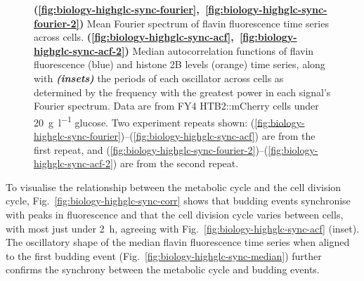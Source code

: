 \begin{figure}[b!]
  \caption[
    Mean Fourier spectrum of flavin fluorescence time series across cells.
    Median autocorrelation functions of flavin fluorescence and histone 2B levels time series, along with the periods of each oscillator across cells.
    Data are from FY4 HTB2::mCherry cells under \SI{20}{\gram~\litre^{-1}} glucose.
  ]{
    \textbf{(\ref{fig:biology-highglc-sync-fourier},~\ref{fig:biology-highglc-sync-fourier-2})} Mean Fourier spectrum of flavin fluorescence time series across cells. \textbf{(\ref{fig:biology-highglc-sync-acf},~\ref{fig:biology-highglc-sync-acf-2})} Median autocorrelation functions of flavin fluorescence (blue) and histone 2B levels (orange) time series, along with \textit{\textbf{(insets)}} the periods of each oscillator across cells as determined by the frequency with the greatest power in each signal's Fourier spectrum.
    Data are from FY4 HTB2::mCherry cells under \SI{20}{\gram~\litre^{-1}} glucose.
    Two experiment repeats shown: (\ref{fig:biology-highglc-sync-fourier})--(\ref{fig:biology-highglc-sync-acf}) are from the first repeat, and (\ref{fig:biology-highglc-sync-fourier-2})--(\ref{fig:biology-highglc-sync-acf-2}) are from the second repeat.
  }
  \label{fig:biology-highglc-sync-spectral}
\end{figure}

To visualise the relationship between the metabolic cycle and the cell division cycle,
Fig.\ \ref{fig:biology-highglc-sync-corr} shows that
budding events synchronise with peaks in fluorescence and
that the cell division cycle varies between cells,
with most just under \SI{2}{\hour}, agreeing with Fig.\ \ref{fig:biology-highglc-sync-acf} (inset).
The oscillatory shape of the median flavin fluorescence time series when aligned to the first budding event (Fig.\ \ref{fig:biology-highglc-sync-median}) further confirms the synchrony between the metabolic cycle and budding events.

